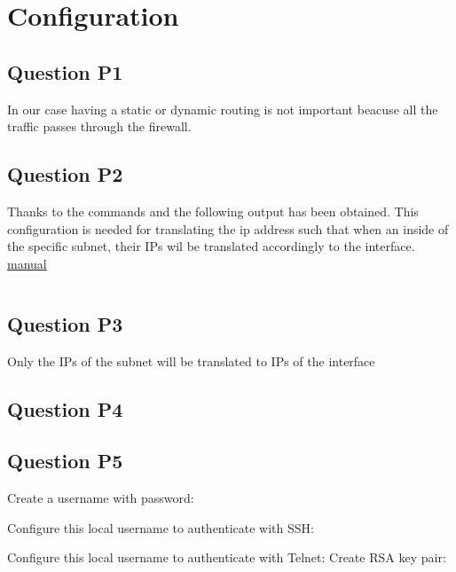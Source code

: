 \section{Configuration}

\subsection{Question P1}
In our case having a static or dynamic routing is not important beacuse all the traffic passes through the firewall.

\subsection{Question P2}
Thanks to the commands   and  the following output has been obtained. This configuration is needed for translating the ip address such that when an inside of the specific subnet, their IPs wil be translated accordingly to the interface.
\href{https://www.cisco.com/c/en/us/td/docs/security/asa/asa96/configuration/firewall/asa-96-firewall-config/nat-reference.html}{manual}
\inputminted{text}{ASA_P2.txt}
\label{conf:Q_P2}


\subsection{Question P3}
Only the IPs of the subnet  will be translated to IPs of the interface 

\subsection{Question P4}
\subsection{Question P5}
Create a username with password:

Configure this local username to authenticate with SSH:

Configure this local username to authenticate with Telnet:
Create RSA key pair:

